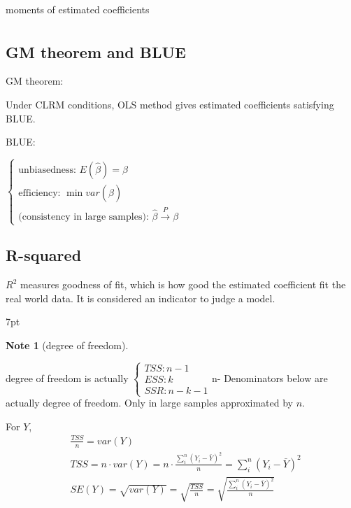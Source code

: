 \documentclass{article}
\newenvironment{blueblock}{
\def\FrameCommand{
  \hspace{1pt}
    {\color{DarkBlue}
    \vrule width 2pt}
    {\color{blueshade}
    \vrule width 4pt}
  \colorbox{blueshade}
}
\MakeFramed{
  \advance
  \hsize-
  \width
  \FrameRestore}
\noindent\hspace{-4.55pt}%
\begin{adjustwidth}{}{7pt}
\vspace{2pt}\vspace{2pt}
}
{\vspace{2pt}\end{adjustwidth}\endMakeFramed}
\newtheorem{note}{Note}
\begin{document}
moments of estimated coefficients
\begin{align}

\end{align}



\subsection{GM theorem and BLUE} %
\label{sub:gm_theorem_and_blue}

GM theorem:

Under CLRM conditions, OLS method gives estimated coefficients satisfying BLUE.

BLUE:

$\begin{cases}
  \text{unbiasedness: } E(\hat{\beta})=\beta
  \\
  \text{efficiency: } \min var(\hat{\beta})
  \\
  \text{(consistency in large samples): } \hat{\beta} \stackrel{P}{\rightarrow} \beta
\end{cases}$


\subsection{R-squared}

$R^2$ measures goodness of fit, which is how good the estimated coefficient fit the real world data. It is considered an indicator to judge a model.

\begin{blueblock}
\begin{note}[degree of freedom]
\end{note}
degree of freedom is actually $\begin{cases}
 TSS: n-1\\
 ESS: k\\
 SSR: n-k-1
\end{cases}$n-
Denominators below are actually degree of freedom. Only in large samples approximated by $n$.
\end{blueblock}

For $Y$,
\begin{align}
&\frac{TSS}{n}=var(Y)
\\& TSS=n \cdot var(Y)=n \cdot \frac{\sum\limits_i^n (Y_i-\bar Y)^2}{n}=\sum\limits_i^n (Y_i-\bar Y)^2
\\& SE(Y)=\sqrt{var(Y)}=\sqrt{\frac{TSS}{n}}=\sqrt{\frac{\sum\limits_i^n (Y_i-\bar Y)^2}{n}}
\end{align}
\end{document}
